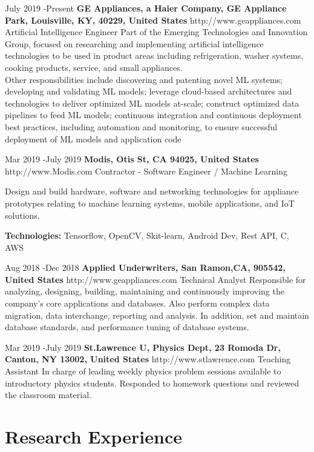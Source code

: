 \documentclass[10pt]{article} %
\begin{document}
\job
{July 2019 -}{Present}
{\bf{GE Appliances, a Haier Company},  \textnormal{GE Appliance Park, Louisville, KY, 40229, United States}}
{http://www.geappliances.com}
{Artificial Intelligence Engineer}
{Part of the Emerging Technologies and Innovation Group, focused on researching and implementing artificial intelligence technologies to be used in product areas including refrigeration, washer systems, cooking products, service, and small appliances. \\ Other responsibilities include discovering and patenting novel ML systems; developing and validating ML models; leverage cloud-based architectures and technologies to deliver optimized ML models at-scale; construct optimized data pipelines to feed ML models; continuous integration and continuous deployment best practices, including automation and monitoring, to ensure successful deployment of ML models and application code}




\job
{Mar 2019 -}{July 2019}
{\bf{Modis}, \textnormal{Otis St, CA 94025, United States}}
{http://www.Modis.com}
{Contractor - Software Engineer / Machine Learning}
{Design and build hardware, software and networking technologies for appliance prototypes relating to machine learning systems, mobile applications, and IoT solutions. 

\rule{0mm}{5mm}\textbf{Technologies:} Tensorflow, OpenCV, Skit-learn, Android Dev, Rest API, C, AWS}



\job
{Aug 2018 -}{Dec 2018}
{\bf{Applied Underwriters},  \textnormal{San Ramon,CA, 905542, United States}}
{http://www.geappliances.com}
{Technical Analyst}
{Responsible for analyzing, designing, building, maintaining and continuously improving the company’s core applications and databases. Also perform complex data migration, data interchange, reporting and analysis. In addition, set and maintain database standards, and performance tuning of database systems.}


\job
{Mar 2019 -}{July 2019}
{\bf{St.Lawrence U, Physics Dept}, \textnormal{23 Romoda Dr, Canton, NY 13002, United States}}
{http://www.stlawrence.com}
{Teaching Assistant}
{In charge of leading weekly physics problem sessions available to introductory physics students. Responded to homework questions and reviewed the classroom material. }


\section{Research Experience}
\end{document}

